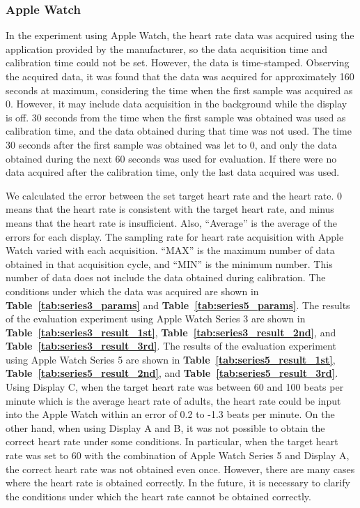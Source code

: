 \documentclass[sigchi,authordraft]{acmart}
\newcommand\tabref[1]{\textbf{Table~\ref{tab:#1}}}
\begin{document}
\subsubsection{Apple Watch}
In the experiment using Apple Watch, the heart rate data was acquired using the application provided by the manufacturer, so the data acquisition time and calibration time could not be set. However, the data is time-stamped. Observing the acquired data, it was found that the data was acquired for approximately 160 seconds at maximum, considering the time when the first sample was acquired as 0. However, it may include data acquisition in the background while the display is off. 30 seconds from the time when the first sample was obtained was used as calibration time, and the data obtained during that time was not used. The time 30 seconds after the first sample was obtained was let to 0, and only the data obtained during the next 60 seconds was used for evaluation. If there were no data acquired after the calibration time, only the last data acquired was used.\par

We calculated the error between the set target heart rate and the heart rate. 0 means that the heart rate is consistent with the target heart rate, and minus means that the heart rate is insufficient. Also, ``Average'' is the average of the errors for each display. The sampling rate for heart rate acquisition with Apple Watch varied with each acquisition. ``MAX'' is the maximum number of data obtained in that acquisition cycle, and ``MIN'' is the minimum number. This number of data does not include the data obtained during calibration. The conditions under which the data was acquired are shown in \tabref{series3_params} and \tabref{series5_params}. The results of the evaluation experiment using Apple Watch Series 3 are shown in \tabref{series3_result_1st}, \tabref{series3_result_2nd}, and \tabref{series3_result_3rd}. The results of the evaluation experiment using Apple Watch Series 5 are shown in \tabref{series5_result_1st}, \tabref{series5_result_2nd}, and \tabref{series5_result_3rd}. Using Display C, when the target heart rate was between 60 and 100 beats per minute which is the average heart rate of adults, the heart rate could be input into the Apple Watch within an error of 0.2 to -1.3 beats per minute. On the other hand, when using Display A and B, it was not possible to obtain the correct heart rate under some conditions. In particular, when the target heart rate was set to 60 with the combination of Apple Watch Series 5 and Display A, the correct heart rate was not obtained even once. However, there are many cases where the heart rate is obtained correctly. In the future, it is necessary to clarify the conditions under which the heart rate cannot be obtained correctly.
\end{document}
